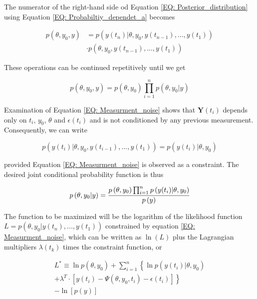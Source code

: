 \documentclass[a4paper,fleqn]{cas-dc}
\begin{document}
The numerator of the right-hand side od Equation \ref{EQ: Posterior_distribution} using Equation \ref{EQ: Probabiltiy_dependet_a} becomes 

\begin{equation}
	\begin{split}
		p\left( \theta,y_0,y \right) &= p\left( y(t_n)|\theta,y_0,y(t_{n-1}),...,y(t_1) \right) \\ &\cdot p\left( \theta,y_0,y(t_{n-1}),...,y(t_1) \right)
	\end{split}
\end{equation}

These operations can be continued repetitively until we get

\begin{equation}
	p\left( \theta,y_0,y \right) = p\left( \theta,y_0 \right) \prod_{i=1}^{n} p\left( \theta,y_0|y \right)
\end{equation}

Examination of Equation \ref{EQ: Measurment_noise} shows that $\textbf{Y}(t_i)$ depends only on $t_i$, $y_0$, $\theta$ and $\epsilon(t_i)$ and is not conditioned by any previous measurement. Consequently, we can write 

\begin{equation}
	p\left( y(t_i)|\theta,y_0, y(t_{i-1}),...,y(t_1) \right) = p\left( y(t_i)|\theta,y_0 \right)
\end{equation}

provided Equation \ref{EQ: Measurment_noise} is observed as a constraint. The desired joint conditional probability function is thus

\begin{equation}
	p\left( \theta,y_0|y \right) = \cfrac{p\left( \theta,y_0 \right) \prod_{i=1}^{n} p\left( y(t_i)|\theta,y_0 \right) }{p\left( y \right)}
\end{equation}

The function to be maximized will be the logarithm of the likelihood function $L = p\left( \theta,y_0| y(t_n),...,y(t_1) \right)$ constrained by equation \ref{EQ: Measurment_noise}, which can be written as $\ln(L)$ plus the Lagrangian multipliers $\lambda(t_k)$ times the constraint function, or

\begin{equation} \label{EQ: MLE_Lagrangian}
	\begin{split}
		L^* \equiv \ln p\left( \theta,y_0 \right) + \sum_{i=1}^{n} \left\{ \ln p(y(t_i)|\theta,y_0) \right. \\
		\left. + \lambda^T \cdot \left[ y(t_i) - \Psi\left( \theta,y_0,t_i \right) - \epsilon(t_i) \right] \right\} \\ - \ln \left[ p\left( y \right) \right]
	\end{split}
\end{equation}
\end{document}

